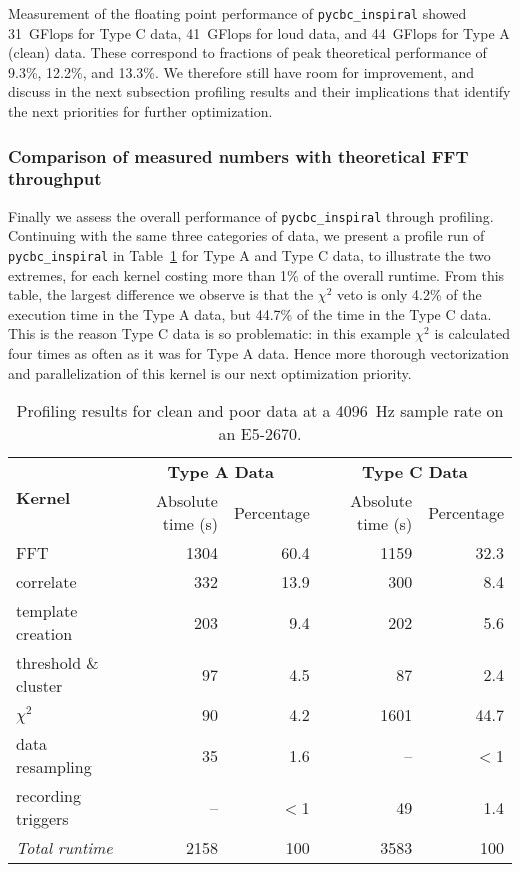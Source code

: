 Measurement of the floating point performance of \texttt{pycbc\_inspiral} showed
31~GFlops for Type C data, 41~GFlops for loud data, and 44~GFlops for Type A
(clean)
data.  These correspond to fractions of peak theoretical performance of 9.3\%,
12.2\%, and 13.3\%. We therefore still have room for improvement, and discuss in
the next subsection profiling results and their implications that identify the
next priorities for further optimization.


\vspace*{-10pt}
\subsubsection{Comparison of measured numbers with theoretical FFT throughput}
\vspace*{-05pt}
\label{sec:measured}

Finally we assess the overall performance of \texttt{pycbc\_inspiral} through
profiling. Continuing with the same three categories of data, we present a
profile run of \texttt{pycbc\_inspiral} in Table~\ref{tab:callgraph} for Type A and Type C data, to illustrate the two
extremes, for each kernel costing more than 1\% of the overall runtime. From
this table, the largest difference we observe is that the 
$\chi^2$ veto is only 4.2\% of the execution time in the Type A data, but 44.7\%
of the time in the Type C data. This is the reason Type C data is so problematic:
in this example $\chi^2$ is calculated four times as often as it was for Type
A data.
Hence more thorough vectorization and parallelization of this kernel is our next
optimization priority.

\begin{table}
  \centering
  \begin{tabular}{|l|r|r|r|r|}\hline
   \multirow{2}{*}{\textbf{Kernel}} & \multicolumn{2}{c|}{\textbf{Type A Data}}
    & \multicolumn{2}{|c|}{\textbf{Type C Data}} \\ \cline{2-5}
    & Absolute time (s) & Percentage & Absolute time (s) & Percentage \\ \hline
    FFT & 1304 & 60.4 & 1159 & 32.3 \\ \hline
    correlate & 332 & 13.9 & 300 & 8.4 \\ \hline
    template creation & 203 & 9.4 & 202 & 5.6 \\ \hline
    threshold \& cluster & 97 & 4.5 & 87 & 2.4 \\ \hline
    $\chi^2$ & 90 & 4.2 & 1601 & 44.7 \\ \hline
    data resampling & 35 & 1.6 & -- & $<$1 \\ \hline
    recording triggers & -- & $<$1 & 49 & 1.4 \\ \hline \hline
    \emph{Total runtime} & 2158 & 100 & 3583 & 100 \\ \hline
  \end{tabular}
  \caption{Profiling results for clean and poor data at a 4096~Hz sample
    rate on an E5-2670. }
  \label{tab:callgraph}
\end{table}

